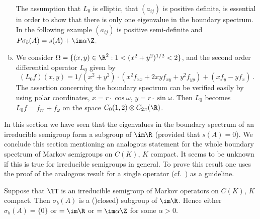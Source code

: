 \begin{examples}
\begin{enumerate}[(a), wide]
	The assumption that $L_{0}$ is elliptic, \ie that $(a_{ij})$ is positive definite, is essential in order to show that there is only one eigenvalue in the boundary spectrum.
	In the following example $(a_{ij})$ is positive semi-definite and $P\sigma_{b}(A) = s(A) + \im\alpha\Z$.
	
	\item 
	We consider $\Omega = \{(x,y) \in \R^{2} : 1 < (x^{2} + y^{2})^{1/2} < 2\}$, and the second order differential operator $L_{0}$ given by
	\[
	(L_{0}f)(x,y) = 1/(x^{2} + y^{2})\cdot(x^{2}f_{xx} + 2xyf_{xy} + y^{2}f_{yy}) + (xf_{y} - yf_{x})\,.
	\]
	The assertion concerning the boundary spectrum can be verified easily by using polar coordinates, $x = r\cdot\cos\omega$, $y = r\cdot\sin\omega$.
	Then $L_{0}$ becomes $L_{0}f = f_{rr} + f_{\omega}$ on the space $C_{0}(1,2) \otimes C_{2\pi}(\R)$.
	\end{enumerate}
\end{examples}
In this section we have seen that the eigenvalues in the boundary spectrum of an irreducible semigroup form a subgroup of $\im \R$ (provided that $s(A) = 0$).
We conclude this section mentioning an analogous statement for the whole boundary spectrum of Markov semigroups on $C(K)$, $K$ compact.
It seems to be unknown if this is true for irreducible semigroups in general.
To prove this result one uses the proof of the analogous result for a single operator (cf.\ \citet[Theorem~7]{schaefer:1968}) as a guideline.
\begin{theorem}\label{thm:b3-3.11}
	Suppose that $\TT$ is an irreducible semigroup of Markov operators on $C(K)$, $K$ compact.
	Then $\sigma_{b}(A)$ is a ()closed) subgroup of $\im \R$.
	Hence either $\sigma_{b}(A) = \{0\}$ or $= \im\R$ or $= \im\alpha\Z$ for some $\alpha > 0$.
\end{theorem}
%
